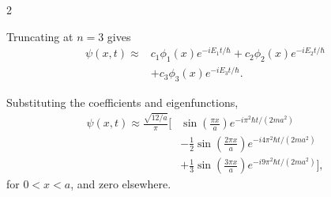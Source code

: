 \documentclass[11pt]{article}
\begin{document}
\begin{problem}{2}
\begin{enumerate}[label=(\alph*)]
\begin{answer}
    Truncating at \(n=3\) gives
    \begin{equation}
      \label{eq:p2-truncated}
      \begin{aligned}
        \psi(x,t)\approx{}&
        c_1\phi_1(x)e^{-iE_1t/\hbar}
        +c_2\phi_2(x)e^{-iE_2t/\hbar}\\
        &+c_3\phi_3(x)e^{-iE_3t/\hbar}.
      \end{aligned}
    \end{equation}

    Substituting the coefficients and eigenfunctions,
    \begin{equation}
      \label{eq:p2-final}
      \boxed{
      \begin{aligned}
        \psi(x,t)\approx
        \frac{\sqrt{12/a}}{\pi}
        \bigg[
        &\sin\left(\frac{\pi x}{a}\right)
        e^{-i\pi^2\hbar t/(2ma^2)}\\
        &-\frac12\sin\left(\frac{2\pi x}{a}\right)
        e^{-i4\pi^2\hbar t/(2ma^2)}\\
        &+\frac13\sin\left(\frac{3\pi x}{a}\right)
        e^{-i9\pi^2\hbar t/(2ma^2)}
        \bigg],
      \end{aligned}
      }
    \end{equation}
    for \(0<x<a\), and zero elsewhere.
          \end{answer}
  \end{enumerate}
\end{problem}
\end{document}
